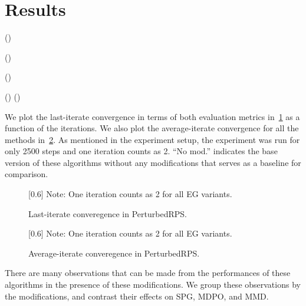 \section{Results}
 ()

 ()

 ()

 ()
 ()

We plot the last-iterate convergence in terms of both evaluation metrics in~\ref{fig:tabne_last} as
a function of the iterations.
We also plot the average-iterate convergence for all the methods in~\ref{fig:tabne_avg}.
As mentioned in the experiment setup, the experiment was run for only 2500 steps and one iteration
counts as 2.
``No mod.'' indicates the base version of these algorithms without any modifications that serves as a baseline
for comparison.

\begin{figure}[h] \centering \hspace*{-2cm} \scalebox{0.6}[0.6]{}
	\tiny{Note: One iteration counts as 2 for all EG variants.}
	\caption{Last-iterate converegence in PerturbedRPS.
	}\label{fig:tabne_last}
\end{figure}

\begin{figure}
	\centering
	\hspace*{-2cm}
	\scalebox{0.6}[0.6]{}
	\tiny{Note: One iteration counts as 2 for all EG variants.}
	\caption{Average-iterate converegence in PerturbedRPS.}\label{fig:tabne_avg}
\end{figure}

There are many observations that can be made from the performances of these algorithms in the
presence of these modifications.
We group these observations by the modifications, and contrast their effects on SPG, MDPO, and MMD.

